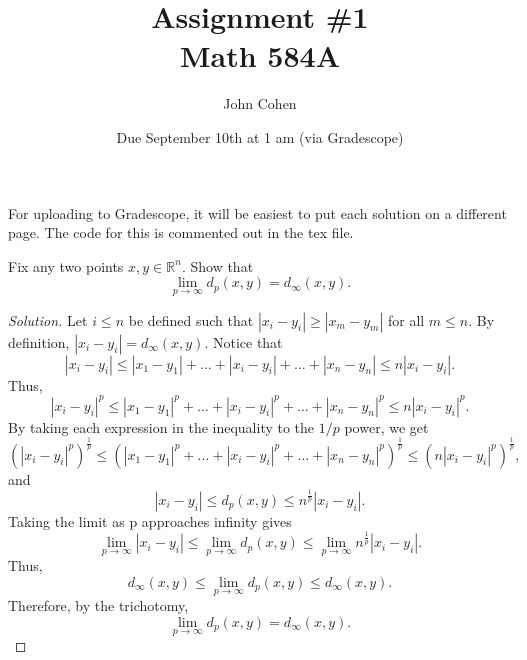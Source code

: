 \documentclass[11pt,letterpaper]{article}
\title{Assignment \#1\\Math 584A}
\author{
	John Cohen
	}
\date{Due September 10th at 1 am (via Gradescope)}
\newcommand{\R}{\mathbb{R}}
\newenvironment{prob}[1]
  {\renewcommand\theinnerprob{#1}\innerprob}
  {\endinnerprob}
\newenvironment{solution}
  {\renewcommand\qedsymbol{}\begin{proof}[Solution]}
  {\end{proof}\bigskip}
\begin{document}
\maketitle

For uploading to Gradescope, it will be easiest to put each solution on a different page.  The code for this is commented out in the tex file.








\begin{prob}{1}  %
Fix any two points $x,y\in \R^n$.  Show that
\[
	\lim_{p\to\infty} d_p(x,y) = d_\infty(x,y).
\]
\end{prob}
\begin{solution}
	Let $i\leq n$ be defined such that $|x_i-y_i| \geq |x_m-y_m|$ for all $m\leq n$. By definition, $|x_i-y_i| = d_\infty(x,y)$. Notice that $$|x_i-y_i| \leq |x_1-y_1| + \dotsc + |x_i-y_i|+ \dotsc + |x_n-y_n|\leq n|x_i-y_i|.$$ Thus, $$|x_i-y_i|^p \leq |x_1-y_1|^p + \dotsc + |x_i-y_i|^p+ \dotsc + |x_n-y_n|^p\leq n|x_i-y_i|^p.$$ By taking each expression in the inequality to the $1/p$ power, we get $$(|x_i-y_i|^p)^{\frac{1}{p}} \leq (|x_1-y_1|^p + \dotsc + |x_i-y_i|^p+ \dotsc +|x_n-y_n|^p)^{\frac{1}{p}} \leq (n|x_i-y_i|^p)^{\frac{1}{p}},$$ and
	\begin{equation}\label{e1}
		|x_i-y_i| \leq d_p(x,y) \leq n^\frac{1}{p}|x_i-y_i|.
	\end{equation}  
	Taking the limit as p approaches infinity gives $$\lim_{p\to\infty}|x_i-y_i| \leq \lim_{p\to\infty}d_p(x,y) \leq \lim_{p\to\infty}n^\frac{1}{p}|x_i-y_i|.$$ Thus, $$d_\infty(x,y) \leq \lim_{p\to\infty}d_p(x,y) \leq d_\infty(x,y).$$ Therefore, by the trichotomy,
	\[
	\lim_{p\to\infty} d_p(x,y) = d_\infty(x,y).
	\]
\end{solution}
\newpage
\end{document}
